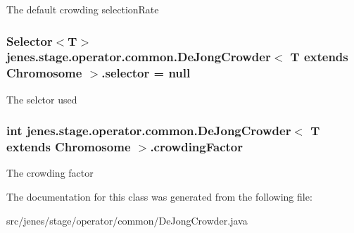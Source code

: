 The default crowding selectionRate \hypertarget{classjenes_1_1stage_1_1operator_1_1common_1_1_de_jong_crowder_3_01_t_01extends_01_chromosome_01_4_6486b0225d345afd81b86dd04772d5ba}{
\subsubsection[selector]{\setlength{\rightskip}{0pt plus 5cm}Selector$<$T$>$ jenes.stage.operator.common.DeJongCrowder$<$ T extends Chromosome $>$.{\bf selector} = null}}
\label{classjenes_1_1stage_1_1operator_1_1common_1_1_de_jong_crowder_3_01_t_01extends_01_chromosome_01_4_6486b0225d345afd81b86dd04772d5ba}


The selctor used \hypertarget{classjenes_1_1stage_1_1operator_1_1common_1_1_de_jong_crowder_3_01_t_01extends_01_chromosome_01_4_d876594787797e723425c09d74d0a05d}{
\subsubsection[crowdingFactor]{\setlength{\rightskip}{0pt plus 5cm}int jenes.stage.operator.common.DeJongCrowder$<$ T extends Chromosome $>$.{\bf crowdingFactor}}}
\label{classjenes_1_1stage_1_1operator_1_1common_1_1_de_jong_crowder_3_01_t_01extends_01_chromosome_01_4_d876594787797e723425c09d74d0a05d}


The crowding factor 

The documentation for this class was generated from the following file:\begin{CompactItemize}
\item 
src/jenes/stage/operator/common/DeJongCrowder.java\end{CompactItemize}
